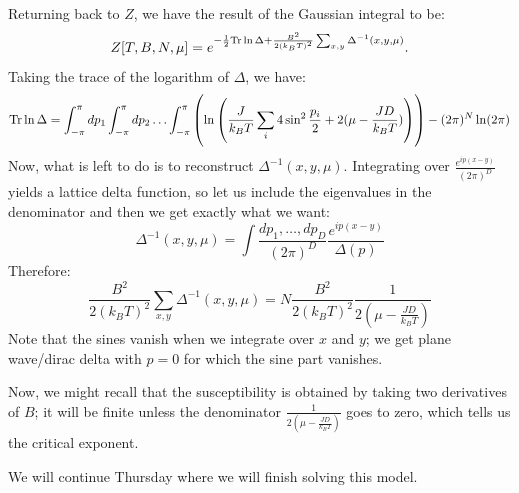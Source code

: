 Returning back to $Z$, we have the result of the Gaussian integral to be:
\begin{equation}
    Z[T, B, N, \mu] = e^{-\frac{1}{2}\mathrm{Tr} \ln \Delta + \frac{B^2}{2(k_B T)^2}\sum_{x, y}\Delta^{-1}(x, y, \mu)}.
\end{equation}
Taking the trace of the logarithm of $\Delta$, we have:
\begin{equation}
    \mathrm{Tr} \ln \Delta = \int_{-\pi}^\pi dp_1 \int_{-\pi}^\pi dp_2 \ldots \int_{-\pi}^\pi \left(\ln \left(\frac{J}{k_B T}\sum_i 4\sin^2\frac{p_i}{2} + 2(\mu - \frac{JD}{k_B T})\right)\right) - (2\pi)^N\ln(2\pi)
\end{equation}
Now, what is left to do is to reconstruct $\Delta^{-1}(x, y, \mu)$. Integrating over $\frac{e^{ip(x - y)}}{(2\pi)^D}$ yields a lattice delta function, so let us include the eigenvalues in the denominator and then we get exactly what we want:
\begin{equation}
    \Delta^{-1}(x, y, \mu) = \int \frac{dp_1, \ldots, dp_D}{(2\pi)^D}\frac{e^{ip(x - y)}}{\Delta (p)}
\end{equation}
Therefore:
\begin{equation}
    \frac{B^2}{2(k_B T)^2}\sum_{x, y}\Delta^{-1}(x, y, \mu) = N\frac{B^2}{2(k_B T)^2}\frac{1}{2(\mu - \frac{JD}{k_B T})}
\end{equation}
Note that the sines vanish when we integrate over $x$ and $y$; we get plane wave/dirac delta with $p = 0$ for which the sine part vanishes.

Now, we might recall that the susceptibility is obtained by taking two derivatives of $B$; it will be finite unless the denominator $\frac{1}{2(\mu - \frac{JD}{k_B T})}$ goes to zero, which tells us the critical exponent.

We will continue Thursday where we will finish solving this model.